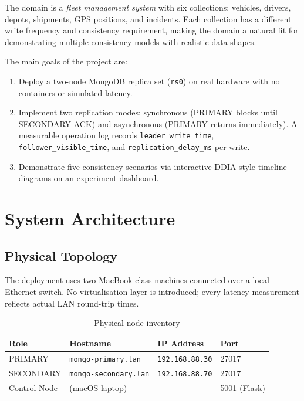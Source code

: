 \documentclass[12pt,a4paper]{article}
\newcommand{\code}[1]{\texttt{\small #1}}
\begin{document}
The domain is a \textit{fleet management system} with six collections: vehicles, drivers,
depots, shipments, GPS positions, and incidents. Each collection has a different write
frequency and consistency requirement, making the domain a natural fit for demonstrating
multiple consistency models with realistic data shapes.

The main goals of the project are:

\begin{sloppypar}
\begin{enumerate}
  \item Deploy a two-node MongoDB replica set (\code{rs0}) on real hardware with no
        containers or simulated latency.
  \item Implement two replication modes: synchronous (PRIMARY blocks until
        SECONDARY ACK) and asynchronous (PRIMARY returns immediately).
        A measurable operation log records \code{leader\_write\_time},
        \code{follower\_visible\_time}, and \code{replication\_delay\_ms}
        per write.
  \item Demonstrate five consistency scenarios via interactive DDIA-style timeline
        diagrams on an experiment dashboard.
\end{enumerate}
\end{sloppypar}

\section{System Architecture}

\subsection{Physical Topology}

The deployment uses two MacBook-class machines connected over a local Ethernet switch.
No virtualisation layer is introduced; every latency measurement reflects actual LAN
round-trip times.

\begin{table}[H]
  \centering
  \caption{Physical node inventory}
  \begin{tabular}{llll}
    \toprule
    Role           & Hostname               & IP Address       & Port  \\
    \midrule
    PRIMARY        & \code{mongo-primary.lan}   & \code{192.168.88.30} & 27017 \\
    SECONDARY      & \code{mongo-secondary.lan} & \code{192.168.88.70} & 27017 \\
    Control Node   & (macOS laptop)         & ---              & 5001 (Flask) \\
    \bottomrule
  \end{tabular}
\end{table}
\end{document}
